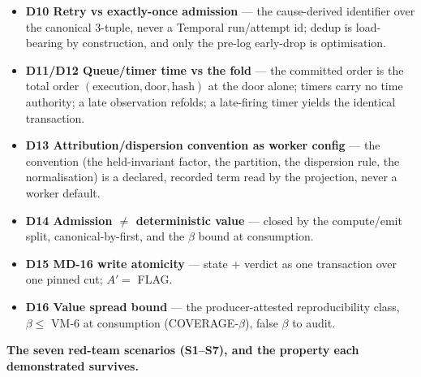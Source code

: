 \documentclass[11pt,a4paper]{article}
\begin{document}
\begin{itemize}[leftmargin=*, itemsep=0pt, topsep=1pt]
\item \textbf{D10 Retry vs exactly-once admission} --- the cause-derived identifier over the canonical
3-tuple, never a Temporal run/attempt id; dedup is load-bearing by construction, and only the pre-log
early-drop is optimisation.
\item \textbf{D11/D12 Queue/timer time vs the fold} --- the committed order is the total order
$(\text{execution},\text{door},\text{hash})$ at the door alone; timers carry no time authority; a late
observation refolds; a late-firing timer yields the identical transaction.
\item \textbf{D13 Attribution/dispersion convention as worker config} --- the convention (the
held-invariant factor, the partition, the dispersion rule, the normalisation) is a declared, recorded term
read by the projection, never a worker default.
\item \textbf{D14 Admission $\neq$ deterministic value} --- closed by the compute/emit split,
canonical-by-first, and the $\beta$ bound at consumption.
\item \textbf{D15 MD-16 write atomicity} --- state $+$ verdict as one transaction over one pinned cut;
$A'=$ FLAG.
\item \textbf{D16 Value spread bound} --- the producer-attested reproducibility class, $\beta \le$ VM-6 at
consumption (COVERAGE-$\beta$), false $\beta$ to audit.
\end{itemize}

\noindent\textbf{The seven red-team scenarios (S1--S7), and the property each demonstrated survives.}
\end{document}
